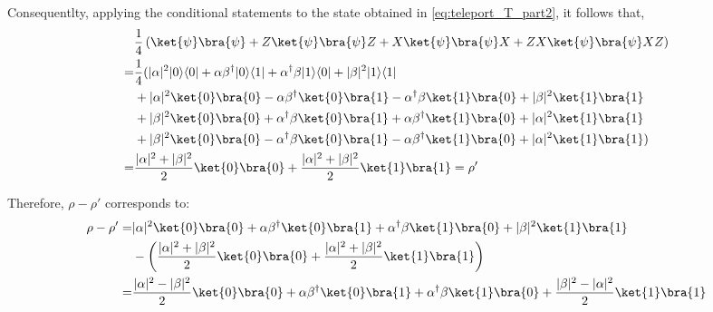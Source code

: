 Consequentlty, applying the conditional statements to the state obtained in \autoref{eq:teleport_T_part2}, it follows that,
\begin{equation}
  \begin{split}
    & \frac{1}{4} \left( \ket{\psi}\bra{\psi} + Z\ket{\psi}\bra{\psi}Z + X\ket{\psi}\bra{\psi}X + ZX\ket{\psi}\bra{\psi}XZ   \right) \\
    = &  \frac{1}{4} ( |\alpha|^{2} |0\rangle \langle 0 | + \alpha \beta^{\dag} |0\rangle \langle 1 | + \alpha^{\dag} \beta |1\rangle \langle 0 | + |\beta|^{2} |1\rangle \langle 1 | \\
     & + |\alpha|^{2} \ket{0}\bra{0} - \alpha \beta^{\dag}  \ket{0}\bra{1}  - \alpha^{\dag} \beta \ket{1}\bra{0} + |\beta|^{2} \ket{1}\bra{1}  \\
     &+ |\beta|^{2} \ket{0}\bra{0} +  \alpha^{\dag}  \beta \ket{0}\bra{1}  +  \alpha \beta^{\dag} \ket{1}\bra{0} + |\alpha|^{2} \ket{1}\bra{1} \\
     & + |\beta|^{2} \ket{0}\bra{0} -  \alpha^{\dag}  \beta \ket{0}\bra{1}  -  \alpha \beta^{\dag} \ket{1}\bra{0} + |\alpha|^{2} \ket{1}\bra{1} ) \\
     = &  \frac{|\alpha|^{2} + |\beta|^{2} } {2}  \ket{0}\bra{0} +  \frac{|\alpha|^{2} + |\beta|^{2} } {2}  \ket{1}\bra{1} = \rho'\\
  \end{split}
\end{equation}

Therefore, $\rho-\rho'$ corresponds to:
\begin{equation}
  \begin{split}
    \rho-\rho' = & |\alpha|^{2} \ket{0}\bra{0} + \alpha \beta^{\dag}  \ket{0}\bra{1}  + \alpha^{\dag} \beta \ket{1}\bra{0} + |\beta|^{2} \ket{1}\bra{1} \\ 
    &- \left( \frac{|\alpha|^{2} + |\beta|^{2} } {2}  \ket{0}\bra{0} +  \frac{|\alpha|^{2} + |\beta|^{2} } {2}  \ket{1}\bra{1} \right) \\
    =  & \frac{|\alpha|^{2} - |\beta|^{2} } {2}  \ket{0}\bra{0} + \alpha \beta^{\dag}  \ket{0}\bra{1}  + \alpha^{\dag} \beta \ket{1}\bra{0} + \frac{|\beta|^{2} - |\alpha|^{2} } {2}  \ket{1}\bra{1} \\
  \end{split}
  \end{equation}

